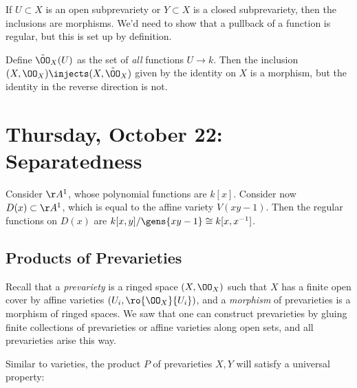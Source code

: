 \begin{remark}

If \(U\subset X\) is an open subprevariety or \(Y\subset X\) is a closed
subprevariety, then the inclusions are morphisms. We'd need to show that
a pullback of a function is regular, but this is set up by definition.

\end{remark}

\begin{remark}

Define \(\tilde \OO_X(U)\) as the set of \emph{all} functions
\(U\to k\). Then the inclusion \((X, \OO_X) \injects (X, \tilde \OO_X)\)
given by the identity on \(X\) is a morphism, but the identity in the
reverse direction is not.

\end{remark}

\hypertarget{thursday-october-22-separatedness}{%
\section{Thursday, October 22:
Separatedness}\label{thursday-october-22-separatedness}}

\begin{example}

Consider \(\AA^1\), whose polynomial functions are \(k[x]\). Consider
now \(D(x) \subset \AA^1\), which is equal to the affine variety
\(V(xy-1)\). Then the regular functions on \(D(x)\) are
\(k[x, y] / \gens{xy-1} \cong k[x, x^{-1} ]\).

\end{example}

\hypertarget{products-of-prevarieties}{%
\subsection{Products of Prevarieties}\label{products-of-prevarieties}}

Recall that a \emph{prevariety} is a ringed space \((X, \OO_X)\) such
that \(X\) has a finite open cover by affine varieties
\((U_i, \ro{\OO_X}{U_i})\), and a \emph{morphism} of prevarieties is a
morphism of ringed spaces. We saw that one can construct prevarieties by
gluing finite collections of prevarieties or affine varieties along open
sets, and all prevarieties arise this way.

Similar to varieties, the product \(P\) of prevarieties \(X, Y\) will
satisfy a universal property:

